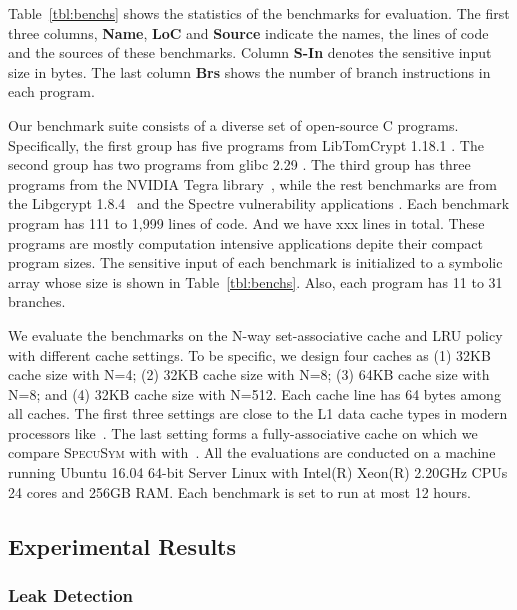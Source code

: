 \documentclass[sigconf, review]{acmart}
\newcommand{\SpecuSym}{\textsc{SpecuSym} }
\begin{document}
Table~\ref{tbl:benchs} shows the statistics of the benchmarks for evaluation.  
The first three columns, \textbf{Name}, \textbf{LoC} and \textbf{Source} 
indicate the names, the lines of code and the sources of these benchmarks. 
Column \textbf{S-In} denotes the sensitive input size in bytes. The last 
column \textbf{Brs} shows the number of branch instructions in each program.


Our benchmark suite consists of a diverse set of open-source C programs. 
Specifically, the first group has five programs from LibTomCrypt 1.18.1
\cite{LibTomCrypt}. The second group has two programs from glibc 2.29
\cite{glibc}. The third group has three programs from the NVIDIA Tegra 
library~\cite{Tegra}, while the rest benchmarks are from the Libgcrypt 
1.8.4~\cite{Libgcrypt} and the Spectre vulnerability applications
\cite{spectre}. Each benchmark program has 111 to 1,999 lines of code. 
And we have xxx lines in total. These programs are mostly computation
intensive applications depite their compact program sizes. The sensitive 
input of each benchmark is initialized to a symbolic array whose size 
is shown in Table~\ref{tbl:benchs}. Also, each program has 11 to 31 
branches.


We evaluate the benchmarks on the N-way set-associative cache and LRU 
policy with different cache settings. To be specific, we design four 
caches as (1) 32KB cache size with N=4; (2) 32KB cache size with N=8; (3) 
64KB cache size with N=8; and (4) 32KB cache size with N=512. Each cache 
line has 64 bytes among all caches. The first three settings are close to 
the L1 data cache types in modern processors like~\cite{Skylake,Kabylake}. 
The last setting forms a fully-associative cache on which we compare 
\SpecuSym with with~\cite{WuW19}. All the evaluations are conducted on a 
machine running Ubuntu 16.04 64-bit Server Linux with Intel(R) Xeon(R) 
2.20GHz CPUs 24 cores and 256GB RAM. Each benchmark is set to run at 
most 12 hours.


\subsection{Experimental Results}
\label{sec:experiments}

\subsubsection{Leak Detection}
\label{sec:leak_detect}
\end{document}
